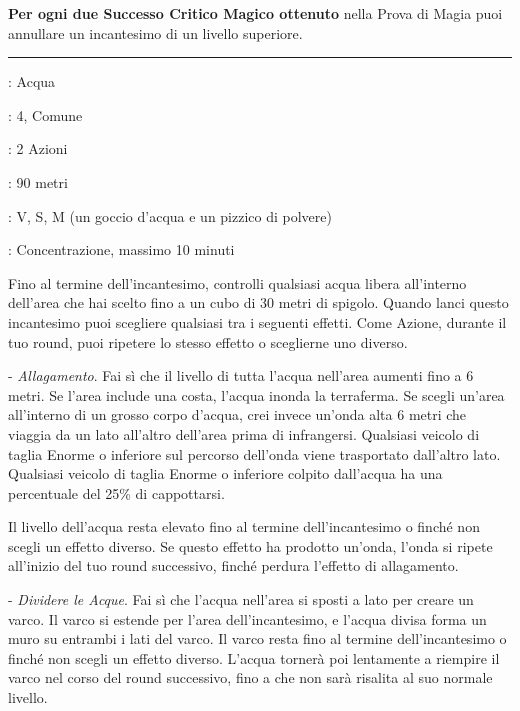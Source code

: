 \begin{multicols}{2}
\textbf{Per ogni due Successo Critico Magico ottenuto} nella Prova di Magia puoi annullare un incantesimo di un livello superiore.

\smallskip\noindent\rule{\linewidth}{2pt} \hypertarget{Controllare Acqua}{}\medskip{}
\noindent
\begin{description}[noitemsep, topsep=0pt, parsep=0pt, partopsep=0pt, leftmargin=0cm, labelwidth=2.8cm]
	\item[\textbf{Lista di Magia}]: Acqua
	\item[\textbf{Livello}]: 4, Comune
	\item[\textbf{T. di Lancio}]: 2 Azioni
	\item[\textbf{Gittata}]: 90 metri
	\item[\textbf{Componenti}]: V, S, M (un goccio d'acqua e un pizzico di polvere)
	\item[\textbf{Durata}]: Concentrazione, massimo 10 minuti
\end{description}

Fino al termine dell'incantesimo, controlli qualsiasi acqua libera all'interno dell'area che hai scelto fino a un cubo di 30 metri di spigolo. Quando lanci questo incantesimo puoi scegliere qualsiasi tra i seguenti effetti. Come Azione, durante il tuo round, puoi ripetere lo stesso effetto o sceglierne uno diverso.

\medskip

- \emph{Allagamento}. Fai sì che il livello di tutta l'acqua nell'area aumenti fino a 6 metri. Se l'area include una costa, l'acqua inonda la terraferma. Se scegli un'area all'interno di un grosso corpo d'acqua, crei invece un'onda alta 6 metri che viaggia da un lato all'altro dell'area prima di infrangersi. Qualsiasi veicolo di taglia Enorme o inferiore sul percorso dell'onda viene trasportato dall'altro lato. Qualsiasi veicolo di taglia Enorme o inferiore colpito dall'acqua ha una percentuale del 25\% di cappottarsi.

Il livello dell'acqua resta elevato fino al termine dell'incantesimo o finché non scegli un effetto diverso. Se questo effetto ha prodotto un'onda, l'onda si ripete all'inizio del tuo round successivo, finché perdura l'effetto di allagamento.

- \emph{Dividere le Acque}. Fai sì che l'acqua nell'area si sposti a lato per creare un varco. Il varco si estende per l'area dell'incantesimo, e l'acqua divisa forma un muro su entrambi i lati del varco. Il varco resta fino al termine dell'incantesimo o finché non scegli un effetto diverso. L'acqua tornerà poi lentamente a riempire il varco nel corso del round successivo, fino a che non sarà risalita al suo normale livello.


\end{multicols}
